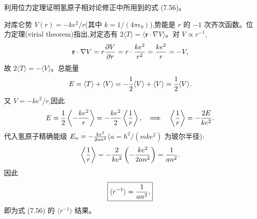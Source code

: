 \begin{question}
利用位力定理证明氢原子相对论修正中所用到的式 (7.56)。

\par\smallskip
{}

\end{question}
\begin{solution}
对库仑势 $V(r)=-ke^2/r$(其中 $k=1/(4\pi\epsilon_0)$),势能是 $r$ 的 $-1$ 次齐次函数。位力定理(virial theorem)指出,对定态有 $2\langle T\rangle = \langle\mathbf r\cdot\nabla V\rangle$。对 $V\propto r^{-1}$,
\[
\mathbf r\cdot\nabla V = r{\partial V\over\partial r}=r\cdot{ke^2\over r^2}={ke^2\over r}=-V,
\]
故 $2\langle T\rangle = -\langle V\rangle$。总能量
\[
E=\langle T\rangle+\langle V\rangle
= -\frac12\langle V\rangle+\langle V\rangle
= {1\over2}\langle V\rangle.
\]
又 $V=-ke^2/r$,因此
\[
E={1\over2}\left\langle -{ke^2\over r}\right\rangle
=-{ke^2\over2}\left\langle{1\over r}\right\rangle,
\quad\Longrightarrow\quad
\left\langle{1\over r}\right\rangle=-{2E\over ke^2}.
\]
代入氢原子精确能级 $E_n=-{ke^2\over2a n^2}$($a=\hbar^2/(mke^2)$ 为玻尔半径):
\[
\left\langle{1\over r}\right\rangle
=-{2\over ke^2}\left(-{ke^2\over2a n^2}\right)
={1\over a n^2}.
\]
因此
\[
\boxed{\langle r^{-1}\rangle={1\over an^2},}
\]
即为式 (7.56) 的 $\langle r^{-1}\rangle$ 结果。
\end{solution}

